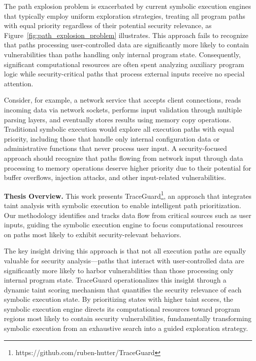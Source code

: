 The path explosion problem is exacerbated by current symbolic execution engines that typically employ uniform exploration strategies, treating all program paths with equal priority regardless of their potential security relevance, as Figure~\ref{fig:path_explosion_problem} illustrates. This approach fails to recognize that paths processing user-controlled data are significantly more likely to contain vulnerabilities than paths handling only internal program state. Consequently, significant computational resources are often spent analyzing auxiliary program logic while security-critical paths that process external inputs receive no special attention.

Consider, for example, a network service that accepts client connections, reads incoming data via network sockets, performs input validation through multiple parsing layers, and eventually stores results using memory copy operations. Traditional symbolic execution would explore all execution paths with equal priority, including those that handle only internal configuration data or administrative functions that never process user input. A security-focused approach should recognize that paths flowing from network input through data processing to memory operations deserve higher priority due to their potential for buffer overflows, injection attacks, and other input-related vulnerabilities.

\textbf{Thesis Overview.} This work presents TraceGuard\footnote{https://github.com/ruben-hutter/TraceGuard}, an approach that integrates taint analysis with symbolic execution to enable intelligent path prioritization. Our methodology identifies and tracks data flow from critical sources such as user inputs, guiding the symbolic execution engine to focus computational resources on paths most likely to exhibit security-relevant behaviors.

The key insight driving this approach is that not all execution paths are equally valuable for security analysis—paths that interact with user-controlled data are significantly more likely to harbor vulnerabilities than those processing only internal program state. TraceGuard operationalizes this insight through a dynamic taint scoring mechanism that quantifies the security relevance of each symbolic execution state. By prioritizing states with higher taint scores, the symbolic execution engine directs its computational resources toward program regions most likely to contain security vulnerabilities, fundamentally transforming symbolic execution from an exhaustive search into a guided exploration strategy.

